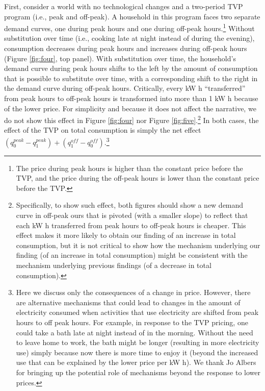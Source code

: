 \documentclass[12pt]{article}
\begin{document}
First, consider a world with no technological changes and a two-period TVP program (i.e., peak and off-peak). A household in this program faces two separate demand curves, one during peak hours and one during off-peak hours.\footnote{The price during peak hours is higher than the constant price before the TVP, and the price during the off-peak hours is lower than the constant price before the TVP.} Without substitution over time (i.e., cooking late at night instead of during the evening), consumption decreases during peak hours and increases during off-peak hours (Figure \ref{fig:four}, top panel). With substitution over time, the household’s demand curve during peak hours shifts to the left by the amount of consumption that is possible to substitute over time, with a corresponding shift to the right in the demand curve during off-peak hours. Critically, every kW h \enquote{transferred} from peak hours to off-peak hours is transformed into more than 1 kW h because of the lower price. For simplicity and because it does not affect the narrative, we do not show this effect in Figure \ref{fig:four} nor Figure \ref{fig:five}.\footnote{Specifically, to show such effect, both figures should show a new demand curve in off-peak ours that is pivoted (with a smaller slope) to reflect that each kW h transferred from peak hours to off-peak hours is cheaper. This effect makes it more likely to obtain our finding of an increase in total consumption, but it is not critical to show how the mechanism underlying our finding (of an increase in total consumption) might be consistent with the mechanism underlying previous findings (of a decrease in total consumption).} In both cases, the effect of the TVP on total consumption is simply the net effect $ \left( q_{0}^{peak}-q_{1}^{peak} \right) + \left( q_{1}^{off}-q_{0}^{off} \right)$.\footnote{Here we discuss only the consequences of a change in price. However, there are alternative mechanisms that could lead to changes in the amount of electricity consumed when activities that use electricity are shifted from peak hours to off peak hours. For example, in response to the TVP pricing, one could take a bath late at night instead of in the morning. Without the need to leave home to work, the bath might be longer (resulting in more electricity use) simply because now there is more time to enjoy it (beyond the increased use that can be explained by the lower price per kW h). We thank Jo Albers for bringing up the potential role of mechanisms beyond the response to lower prices.}
\end{document}
